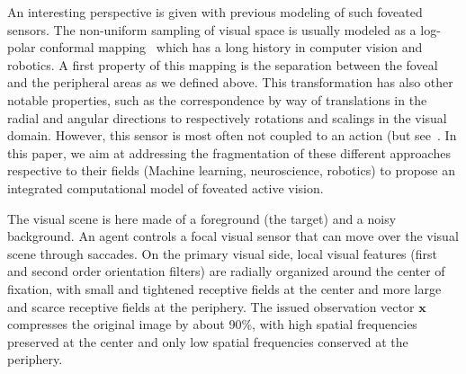 An interesting perspective is given with previous modeling of such foveated sensors. The non-uniform sampling of visual space is usually modeled as a log-polar conformal mapping~\citep{Traver10} which has a long history in computer vision and robotics. A first property of this mapping is the separation between the foveal and the peripheral areas as we defined above. This transformation has also other notable properties, such as the correspondence by way of translations in the radial and angular directions to respectively rotations and scalings in the visual domain. However, this sensor is most often not coupled to an action (but see~\citep{ref needed)}. In this paper, we aim at addressing the fragmentation of these different approaches respective to their fields (Machine learning, neuroscience, robotics) to propose an integrated computational model of foveated active vision.
\fi


\CNS

The visual scene is here made of a foreground (the target) and a noisy background. An agent controls a focal visual sensor that can move over the visual scene through saccades. 
On the primary visual side, local visual features (first and second order orientation filters) are radially organized around the center of fixation, with small and tightened receptive fields at the center and more large and scarce receptive fields at the periphery. The issued observation vector $\boldsymbol{x}$ compresses the original image by about 90\%, with high spatial frequencies preserved at the center and only low spatial frequencies conserved at the periphery. 
\fi

